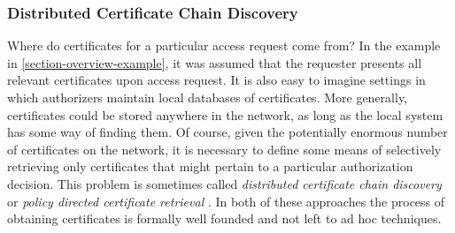 %


\subsubsection{Distributed Certificate Chain Discovery} Where do 
certificates for a particular access request come from?  In the
example in \autoref{section-overview-example}, it was assumed that the
requester presents all relevant certificates upon access request.  It
is also easy to imagine settings in which authorizers maintain local
databases of certificates.  More generally, certificates could be
stored anywhere in the network, as long as the local system has some
way of finding them.  Of course, given the potentially enormous number
of certificates on the network, it is necessary to define some means
of selectively retrieving only certificates that might pertain to a
particular authorization decision.  This problem is sometimes called
\emph{distributed certificate chain discovery} \cite{Li:DCDTM} or
\emph{policy directed certificate retrieval} \cite{Gunter:PDCR}.  In
both of these approaches the process of obtaining certificates is formally
well founded and not left to ad hoc techniques.

